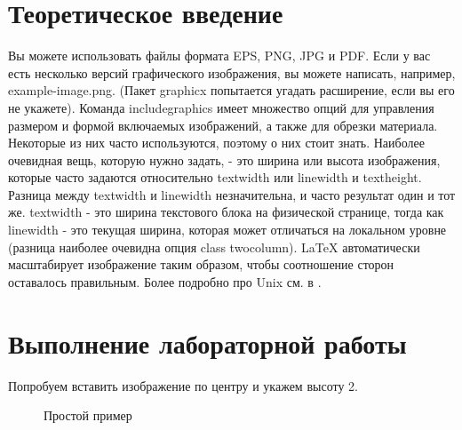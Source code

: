 \documentclass[
  english,
  russian,
  12pt,
  a4paper,
  DIV=11,
  numbers=noendperiod]{scrreprt}
\begin{document}
\chapter{Теоретическое
введение}\label{ux442ux435ux43eux440ux435ux442ux438ux447ux435ux441ux43aux43eux435-ux432ux432ux435ux434ux435ux43dux438ux435}

Вы можете использовать файлы формата EPS, PNG, JPG и PDF. Если у вас
есть несколько версий графического изображения, вы можете написать,
например, example-image.png. (Пакет graphicx попытается угадать
расширение, если вы его не укажете). Команда includegraphics имеет
множество опций для управления размером и формой включаемых изображений,
а также для обрезки материала. Некоторые из них часто используются,
поэтому о них стоит знать. Наиболее очевидная вещь, которую нужно
задать, - это ширина или высота изображения, которые часто задаются
относительно textwidth или linewidth и textheight. Разница между
textwidth и linewidth незначительна, и часто результат один и тот же.
textwidth - это ширина текстового блока на физической странице, тогда
как linewidth - это текущая ширина, которая может отличаться на
локальном уровне (разница наиболее очевидна опция class twocolumn).
LaTeX автоматически масштабирует изображение таким образом, чтобы
соотношение сторон оставалось правильным. Более подробно про Unix см. в
\autocite{kotelnikov_chebotaev_book_latex2_ru,lvovsky_book_latex_ru}.

\chapter{Выполнение лабораторной
работы}\label{ux432ux44bux43fux43eux43bux43dux435ux43dux438ux435-ux43bux430ux431ux43eux440ux430ux442ux43eux440ux43dux43eux439-ux440ux430ux431ux43eux442ux44b}

Попробуем вставить изображение по центру и укажем высоту 2.

\begin{figure}


\caption{\label{fig-001}Простой пример}

\end{figure}%
\end{document}
